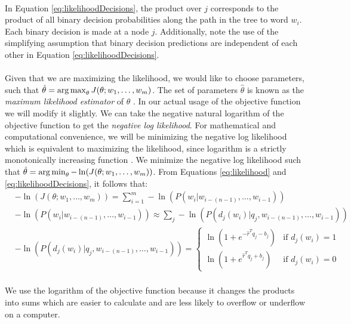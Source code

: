 \paragraph{}
In Equation \ref{eq:likelihoodDecisions}, the product over $j$ corresponds to the product of all binary decision probabilities along the path in the tree to word $w_i$. Each binary decision is made at a node $j$. Additionally, note the use of the simplifying assumption that binary decision predictions are independent of each other in Equation \ref{eq:likelihoodDecisions}.
\paragraph{}
Given that we are maximizing the likelihood, we would like to choose parameters, such that $\hat{\theta} = \operatorname*{arg\,max}_\theta J(\theta;w_1,\dots, w_m)$. The set of parameters $\hat{\theta}$ is known as the \emph{maximum likelihood estimator} of $\theta$ \cite{Elkan2013}.  In our actual usage of the objective function we will modify it slightly. We can take the negative natural logarithm of the objective function to get the \emph{negative log likelihood}. For mathematical and computational convenience, we will be minimizing the negative log likelihood which is equivalent to maximizing the likelihood, since logarithm is a strictly monotonically increasing function \cite{Elkan2013}. We minimize the negative log likelihood such that  $\hat{\theta} = \operatorname*{arg\,min}_\theta -\ln(J(\theta;w_1,\dots, w_m))$.
From Equations \ref{eq:likelihood} and \ref{eq:likelihoodDecisions}, it follows that:
\begin{align}
&-\ln(J(\theta;w_1,\dots, w_m)) = \sum_{i=1}^{m} -\ln(P(w_i | w_{i-(n-1)},\dots, w_{i-1}))
\\
&-\ln(P(w_i | w_{i-(n-1)},\dots, w_{i-1})) \approx \sum_j - \ln(P(d_j(w_i) | q_j, w_{i-(n-1)},\dots, w_{i-1})) 
\\
&- \ln(P(d_j(w_i) | q_j, w_{i-(n-1)},\dots, w_{i-1})) = 
\begin{cases}
  \ln (1 + e^{-\hat{r}^T q_{j} -b_{j}}) 	      & \text{if } d_j(w_i)  = 1 \\
  \ln (1 + e^{\hat{r}^T q_{j} +b_{j}})    & \text{if } d_j(w_i) = 0
  \end{cases} \nonumber
\end{align}

\paragraph{}
We use the logarithm of the objective function because it changes the products into sums which are easier to calculate and are less likely to overflow or underflow on a computer.

